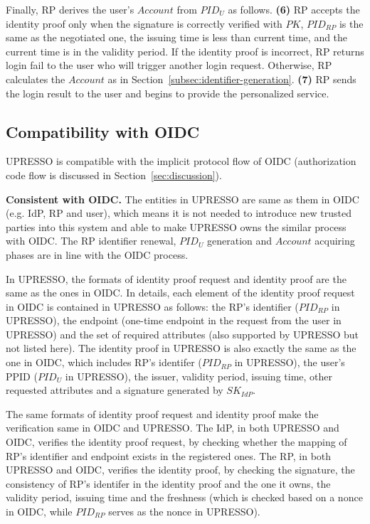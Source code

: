 Finally, RP derives the user's  $Account$ from $PID_U$ as follows. \textbf{(6)} RP accepts the identity proof only when the signature is correctly verified with $PK$, $PID_{RP}$ is the same as the negotiated one, the issuing time is less than current time, and the current time is in the validity period. If the identity proof is incorrect, RP returns login fail to the user who will trigger another login request. Otherwise, RP calculates the $Account$ as in Section~\ref{subsec:identifier-generation}. \textbf{(7)} RP sends the login result to the user and begins to provide the personalized service.


\subsection{Compatibility with OIDC}
\label{subsec:compatible}
UPRESSO is compatible with the implicit protocol flow of OIDC (authorization code flow is discussed in Section~\ref{sec:discussion}).

\vspace{1mm}\noindent \textbf{Consistent with OIDC.}
The entities in UPRESSO are same as them in OIDC (e.g. IdP, RP and user), which means it is not needed to introduce new trusted parties into this system and able to make UPRESSO owns the similar process with OIDC. The RP identifier renewal, $PID_U$ generation and $Account$ acquiring phases are in line with the OIDC process.

In UPRESSO, the formats of identity proof request and identity proof are the same as the ones in OIDC. In details, each element of the identity proof request in OIDC is contained in UPRESSO as follows: the RP's identifier ($PID_{RP}$ in UPRESSO), the endpoint (one-time endpoint in the request from the user in UPRESSO) and the set of required attributes (also supported by UPRESSO but not listed here). The identity proof in UPRESSO is also exactly the same as the one in OIDC, which includes RP's identifer ($PID_{RP}$ in UPRESSO), the user's PPID ($PID_U$ in UPRESSO), the issuer, validity period, issuing time, other requested attributes and a signature generated by $SK_{IdP}$.

The same formats of identity proof request and identity proof make the verification same in OIDC and UPRESSO. The IdP, in both UPRESSO and OIDC, verifies the identity proof request, by checking whether the mapping of RP's identifier and endpoint exists in the registered ones. The RP, in both UPRESSO and OIDC, verifies the identity proof, by checking the signature, the consistency of RP's identifer in the identity proof and the one it owns, the validity period, issuing time and the freshness (which is checked based on a nonce in  OIDC, while  $PID_{RP}$ serves as the nonce in UPRESSO).

